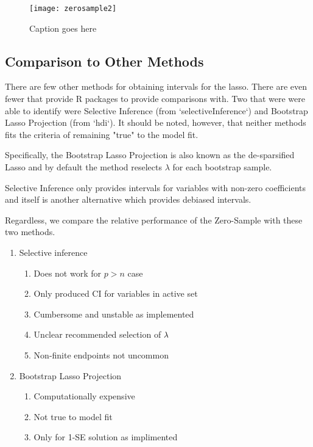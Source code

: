 \begin{figure}
  \texttt{[image: zerosample2]}
  \caption{\label{Fig:zerosample2} Caption goes here}
\end{figure}

\subsection{Comparison to Other Methods}

There are few other methods for obtaining intervals for the lasso. There are even fewer that provide R packages to provide comparisons with. Two that were were able to identify were Selective Inference (from `selectiveInference`) and Bootstrap Lasso Projection (from `hdi`). It should be noted, however, that neither methods fits the criteria of remaining "true" to the model fit.

Specifically, the Bootstrap Lasso Projection is also known as the de-sparsified Lasso and by default the method reselects $\lambda$ for each bootstrap sample.

Selective Inference only provides intervals for variables with non-zero coefficients and itself is another alternative which provides debiased intervals.

Regardless, we compare the relative performance of the Zero-Sample with these two methods.

\begin{enumerate}
\item Selective inference
\begin{enumerate}
\item Does not work for $p > n$ case
\item Only produced CI for variables in active set
\item Cumbersome and unstable as implemented
\item Unclear recommended selection of $\lambda$
\item Non-finite endpoints not uncommon
\end{enumerate}
\item{Bootstrap Lasso Projection}
\begin{enumerate}
\item Computationally expensive
\item Not true to model fit
\item Only for 1-SE solution as implimented
\end{enumerate}
\end{enumerate}

